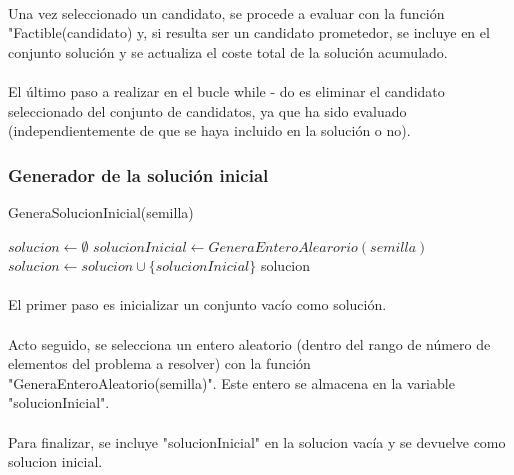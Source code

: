 \documentclass{article}
\begin{document}
		\paragraph{}Una vez seleccionado un candidato, se procede a evaluar con la función "Factible(candidato) y, si resulta ser un candidato prometedor, se incluye en el conjunto solución y se actualiza el coste total de la solución acumulado.
		
		\paragraph{}El último paso a realizar en el bucle while - do es eliminar el candidato seleccionado del conjunto de candidatos, ya que ha sido evaluado (independientemente de que se haya incluido en la solución o no).
	
	

	\subsubsection{Generador de la solución inicial}
		\begin{algorithm}[H]
			\caption{GeneraSolucionInicial(semilla)}
			\begin{algorithmic}
				\STATE $solucion \leftarrow \emptyset$
				\STATE $solucionInicial \leftarrow GeneraEnteroAlearorio(semilla)$
				\STATE $solucion \leftarrow solucion \cup \{solucionInicial\}$
				\RETURN solucion
			\end{algorithmic}
		\end{algorithm}
	
		\paragraph{}El primer paso es inicializar un conjunto vacío como solución.
			
		\paragraph{}Acto seguido, se selecciona un entero aleatorio (dentro del rango de número de elementos del problema a resolver) con la función "GeneraEnteroAleatorio(semilla)". Este entero se almacena en la variable "solucionInicial".
		
		\paragraph{}Para finalizar, se incluye "solucionInicial" en la solucion vacía y se devuelve como solucion inicial.
\end{document}
